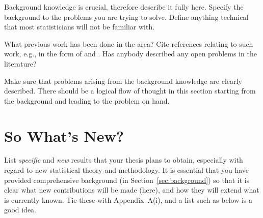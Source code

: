 \documentclass[12pt,a4paper]{article}
\begin{document}
Background knowledge is crucial, therefore describe it fully here.
Specify the background to the problems you are trying to solve.
Define anything technical that most statisticians will not be
familiar with.


What previous work has been done in the area?
Cite references relating to such work, e.g.,
in the form of \cite{reid:2003} and \cite{efro:tibs:1993}.
Has anybody described any open problems in the literature?


Make sure that problems arising from the background knowledge
are clearly described. There should be a logical flow of thought
in this section starting from the background and leading to the
problem on hand.
















\section{So What's New?}
\label{sec:whatsnew}



List \textit{specific} and \textit{new} results that your thesis
plans to obtain, especially with regard to new statistical theory
and methodology.
It is essential that you have provided comprehensive background
(in Section~\ref{sec:background})
so that it is clear what new contributions will be made (here),
and how they will extend what is currently known.
Tie these with Appendix~A(i), and a list such as below is a
good idea.
\end{document}
